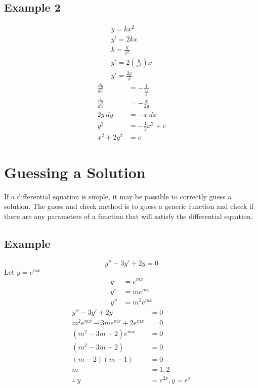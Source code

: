 \documentclass{article}
\theoremstyle{mytheoremstyle}
\theoremstyle{mytheoremstyle}
\theoremstyle{myproblemstyle}
\begin{document}
    \subsection*{Example 2}
    \begin{align*}
        y = kx^2 \\
        y' = 2kx \\
        k = \frac{y}{x^2} \\
        y' = 2(\frac{y}{x^2})x \\
        y' = \frac{2y}{x}
    \end{align*}
    \begin{align*}
        \frac{dy}{dx} &= -\frac{1}{\frac{2y}{x}} \\
        \frac{dy}{dx} &= -\frac{x}{2y} \\
        2y\ dy &= -x\ dx \\
        y^2 &= -\frac{1}{2} x^2 + c \\
        x^2 + 2y^2 &= c
    \end{align*}


    \section*{Guessing a Solution}
    If a differential equation is simple, it may be possible to correctly guess
    a solution. The guess and check method is to guess a generic function and
    check if there are any parameters of a function that will satisfy the
    differential equation.
    \subsection*{Example}
    \[
        y'' - 3y' + 2y = 0
    \]
    Let $y = e^{mx}$
    \begin{align*}
        y &= e^{mx} \\
        y' &= me^{mx} \\
        y''  &= m^2e^{mx}
    \end{align*}
    \begin{align*}
        y'' - 3y' + 2y &= 0 \\
        m^2e^{mx} - 3me^{mx} + 2e^{mx} &= 0 \\
        (m^2 - 3m + 2)e^{mx} &= 0 \\
        (m^2 - 3m + 2) &= 0 \\
        (m-2)(m-1) &= 0 \\
        m &= 1,2 \\
        \therefore\ y&=e^{2x}, y=e^{x}
    \end{align*}
\end{document}
